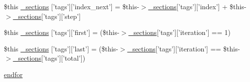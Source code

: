 \begin{DoxyCompactItemize}
\item 
\$this \hyperlink{34d6fa4bfd5eef6424a9ddc74a166350_2_06_06972_05_06_06972954595_05docblock_8tpl_8php_a2dedc9fb40488f277bc5fc7d3bd6ba5a}{\-\_\-sections} \mbox{[}'tags'\mbox{]}\mbox{[}'index\-\_\-next'\mbox{]} = \$this-\/$>$\hyperlink{_06_06127_05_06_0612781687_05pkgelementindex_8tpl_8php_a9e3d26b39edfe29c3f29b8035ef33828}{\-\_\-sections}\mbox{[}'tags'\mbox{]}\mbox{[}'index'\mbox{]} + \$this-\/$>$\hyperlink{_06_06127_05_06_0612781687_05pkgelementindex_8tpl_8php_a9e3d26b39edfe29c3f29b8035ef33828}{\-\_\-sections}\mbox{[}'tags'\mbox{]}\mbox{[}'step'\mbox{]}
\item 
\$this \hyperlink{34d6fa4bfd5eef6424a9ddc74a166350_2_06_06972_05_06_06972954595_05docblock_8tpl_8php_ae52f8d59c03dd2496b7220074afcda44}{\-\_\-sections} \mbox{[}'tags'\mbox{]}\mbox{[}'first'\mbox{]} = (\$this-\/$>$\hyperlink{_06_06127_05_06_0612781687_05pkgelementindex_8tpl_8php_a9e3d26b39edfe29c3f29b8035ef33828}{\-\_\-sections}\mbox{[}'tags'\mbox{]}\mbox{[}'iteration'\mbox{]} == 1)
\item 
\$this \hyperlink{34d6fa4bfd5eef6424a9ddc74a166350_2_06_06972_05_06_06972954595_05docblock_8tpl_8php_acdfe27223b28b2775a756843068c6c72}{\-\_\-sections} \mbox{[}'tags'\mbox{]}\mbox{[}'last'\mbox{]} = (\$this-\/$>$\hyperlink{_06_06127_05_06_0612781687_05pkgelementindex_8tpl_8php_a9e3d26b39edfe29c3f29b8035ef33828}{\-\_\-sections}\mbox{[}'tags'\mbox{]}\mbox{[}'iteration'\mbox{]} == \$this-\/$>$\hyperlink{_06_06127_05_06_0612781687_05pkgelementindex_8tpl_8php_a9e3d26b39edfe29c3f29b8035ef33828}{\-\_\-sections}\mbox{[}'tags'\mbox{]}\mbox{[}'total'\mbox{]})
\item 
\hyperlink{34d6fa4bfd5eef6424a9ddc74a166350_2_06_06972_05_06_06972954595_05docblock_8tpl_8php_ae8fdc27183f296411bac00ed522ee1ac}{endfor}
\end{DoxyCompactItemize}


